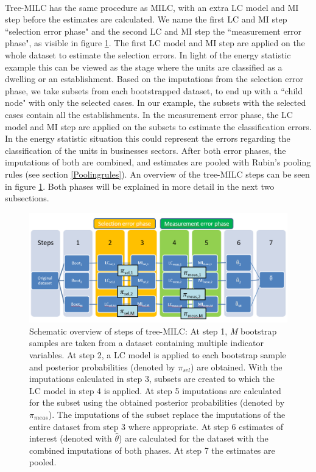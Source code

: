 \documentclass[a4paper, 11pt]{article} %
\begin{document}
\\Tree-MILC has the same procedure as MILC, with an extra LC model and MI step before the estimates are calculated. We name the first LC and MI step ``selection error phase" and the second LC and MI step the ``measurement error phase", as visible in figure \ref{fig:treeMILC}. The first LC model and MI step are applied on the whole dataset to estimate the selection errors. In light of the energy statistic example this can be viewed as the stage where the units are classified as a dwelling or an establishment. Based on the imputations from the selection error phase, we take subsets from each bootstrapped dataset, to end up with a ``child node" with only the selected cases. In our example, the subsets with the selected cases contain all the establishments. In the measurement error phase, the LC model and MI step are applied on the subsets to estimate the classification errors. In the energy statistic situation this could represent the errors regarding the classification of the units in businesses sectors. After both error phases, the imputations of both are combined, and estimates are pooled with Rubin's pooling rules (see section \ref{Poolingrules}). An overview of the tree-MILC steps can be seen in figure \ref{fig:treeMILC}. Both phases will be explained in more detail in the next two subsections.
\begin{figure}[h]
    \centering
    \includegraphics[scale=.7]{TreeMILCprocess9mei.png}
    \caption{Schematic overview of steps of tree-MILC: 
    At step 1, \textit{M} bootstrap samples are taken from a dataset containing multiple indicator variables. At step 2, a LC model is applied to each bootstrap sample and posterior probabilities (denoted by $\pi_{sel}$) are obtained. With the imputations calculated in step 3, subsets are created to which the LC model in step 4 is applied. At step 5 imputations are calculated for the subset using the obtained posterior probabilities (denoted by $\pi_{meas}$). The imputations of the subset replace the imputations of the entire dataset from step 3 where appropriate. At step 6 estimates of interest (denoted with $\hat\theta$) are calculated for the dataset   with the combined imputations of both phases. At step 7 the estimates are pooled.} 
    \label{fig:treeMILC}
\end{figure}
\end{document}
